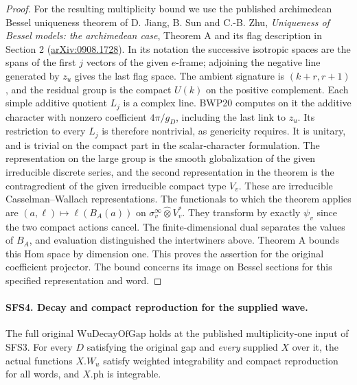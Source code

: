 \begin{proof}
For the resulting multiplicity bound we use the published
archimedean Bessel uniqueness theorem of D. Jiang, B. Sun and
C.-B. Zhu, \emph{Uniqueness of Bessel models: the archimedean
case}, Theorem A and its flag description in Section 2
(\href{https://arxiv.org/abs/0908.1728}{arXiv:0908.1728}).
In its notation the successive isotropic spaces are the spans
of the first $j$ vectors of the given $e$-frame; adjoining the
negative line generated by $z_u$ gives the last flag space.
The ambient signature is $(k+r,r+1)$, and the residual group is
the compact $U(k)$ on the positive complement. Each simple
additive quotient $L_j$ is a complex line. BWP20 computes on it
the additive character with nonzero coefficient $4\pi/g_D$,
including the last link to $z_u$. Its restriction to every
$L_j$ is therefore nontrivial, as genericity requires. It is unitary, and is trivial on the
compact part in the scalar-character formulation.
The representation on the large group is the smooth
globalization of the given irreducible discrete series, and the
second representation in the theorem is the contragredient
of the given irreducible compact type $V_v$. These are irreducible
Casselman--Wallach representations. The functionals to which the
theorem applies are
$(a,\ell)\mapsto\ell(B_A(a))$ on
$\sigma_v^\infty\widehat\otimes V_v^*$.
They transform by exactly $\psi_v$ since the two compact actions
cancel. The finite-dimensional dual separates the values of
$B_A$, and evaluation distinguished the intertwiners above.
Theorem A bounds this Hom space by dimension one. This proves
the assertion for the original coefficient projector. The
bound concerns its image on Bessel sections for this specified
representation and word.
\end{proof}

\paragraph{SFS4. Decay and compact reproduction for the supplied wave.}
\label{claim:SFS4}
The full original $\mathrm{WuDecayOfGap}$ holds at the published
multiplicity-one input of SFS3. For every $D$ satisfying the
original gap and \emph{every} supplied $X$ over it, the actual
functions $X.W_u$ satisfy weighted integrability and compact
reproduction for all words, and $X.\mathrm{ph}$ is integrable.

